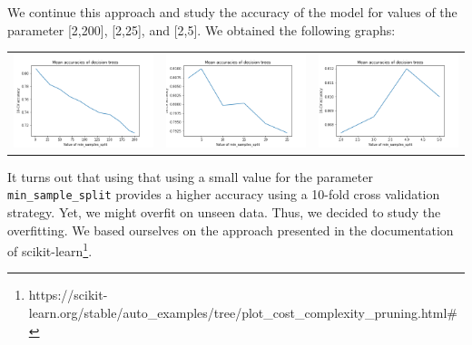 \documentclass[a4paper, 11pt, oneside]{article}
\begin{document}
We continue this approach and study the accuracy of the model for values of the parameter [2,200], [2,25], and [2,5]. We obtained the following graphs:
\begin{table}[H]
\centering
\begin{tabular}{lll}
\includegraphics[scale=0.35]{dt/dt_basic_accuracies_3.png} & \includegraphics[scale=0.35]{dt/dt_basic_accuracies_4.png} & \includegraphics[scale=0.35]{dt/dt_basic_accuracies_5.png}
\end{tabular}
\end{table}
It turns out that using that using a small value for the parameter \texttt{min\_sample\_split} provides a higher accuracy using a 10-fold cross validation strategy. Yet, we might overfit on unseen data. Thus, we decided to study the overfitting. We based ourselves on the approach presented in the documentation of scikit-learn\footnote{https://scikit-learn.org/stable/auto\_examples/tree/plot\_cost\_complexity\_pruning.html\#}.
\end{document}
